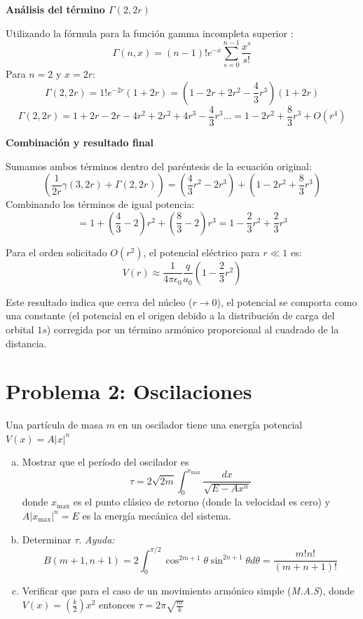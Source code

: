 \documentclass[a4paper]{article}
\begin{document}
\textbf{Análisis del término $\Gamma(2, 2r)$}

Utilizando la fórmula para la función gamma incompleta superior :
$$\Gamma(n, x) = (n-1)! e^{-x} \sum_{s=0}^{n-1} \frac{x^s}{s!}$$
Para $n=2$ y $x=2r$:
$$\Gamma(2, 2r) = 1! e^{-2r} (1 + 2r) = (1 - 2r + 2r^2 - \frac{4}{3}r^3)(1 + 2r)$$
$$\Gamma(2, 2r) = 1 + 2r - 2r - 4r^2 + 2r^2 + 4r^3 - \frac{4}{3}r^3 \dots = 1 - 2r^2 + \frac{8}{3}r^3 + O(r^4)$$

\textbf{Combinación y resultado final}

Sumamos ambos términos dentro del paréntesis de la ecuación original:
$$\left( \frac{1}{2r} \gamma(3, 2r) + \Gamma(2, 2r) \right) = (\frac{4}{3}r^2 - 2r^3) + (1 - 2r^2 + \frac{8}{3}r^3)$$
Combinando los términos de igual potencia:
$$= 1 + (\frac{4}{3} - 2)r^2 + (\frac{8}{3} - 2)r^3 = 1 - \frac{2}{3}r^2 + \frac{2}{3}r^3$$

Para el orden solicitado $O(r^2)$, el potencial eléctrico para $r \ll 1$ es:
\begin{equation}
V(r) \approx \frac{1}{4\pi\epsilon_0} \frac{q}{a_0} \left( 1 - \frac{2}{3}r^2 \right)
\end{equation}

Este resultado indica que cerca del núcleo ($r \to 0$), el potencial se comporta como una constante (el potencial en el origen debido a la distribución de carga del orbital $1s$) corregida por un término armónico proporcional al cuadrado de la distancia.

\section{Problema 2: Oscilaciones}

Una partícula de masa $m$ en un oscilador tiene una energía potencial $V(x)=A|x|^n$

\begin{enumerate}[a.]
	\item Mostrar que el período del oscilador es $$\tau = 2\sqrt{2m}\int_{0}^{x_{\text{max}}}\frac{dx}{\sqrt{E-Ax^n}}$$ donde $x_{\text{max}}$ es el punto clásico de retorno (donde la velocidad es cero) y $A|x_{\text{max}}|^n=E$ es la energía mecánica del sistema.
	\item Determinar $\tau$. \textit{Ayuda:} $$B(m+1,n+1) = 2\int_{0}^{\pi/2} \cos^{2m+1}\theta \sin^{2n+1}\theta d\theta=\frac{m!n!}{(m+n+1)!}$$
	\item Verificar que para el caso de un movimiento armónico simple (\textit{M.A.S}), donde $V(x) = \left(\frac{k}{2}\right)x^2$ entonces $\tau = 2\pi \sqrt{\frac{m}{k}}$
\end{enumerate}
\end{document}

